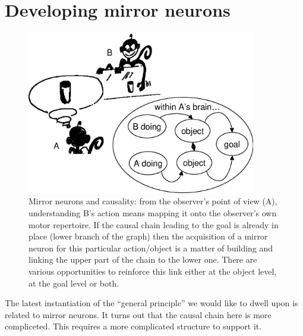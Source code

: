 
\section{Developing mirror neurons}

\begin{figure}[tb]
\begin{center}
\includegraphics[width=10cm]{mirror-monkey.eps}
\caption{ 
\label{fig:mirror-monkey}
%
Mirror neurons and causality: from the observer's point
of view (A), understanding B's action means mapping it onto the
observer's own
motor repertoire. If the causal chain leading to the goal is already
in place (lower branch of the graph) then the acquisition of a
mirror neuron for this particular action/object is a matter of
building and linking the upper part of the chain to the lower one.
There are various opportunities to reinforce this link either at the object
level, at the goal level or both. 
%
}
\end{center}
\end{figure}

\ifverbose
The latest instantiation of the ``general principle'' we would like to
dwell upon is related to mirror neurons. It turns out that the causal
chain here is more compliceted. This requires a more complicated
structure to support it.
\fi


